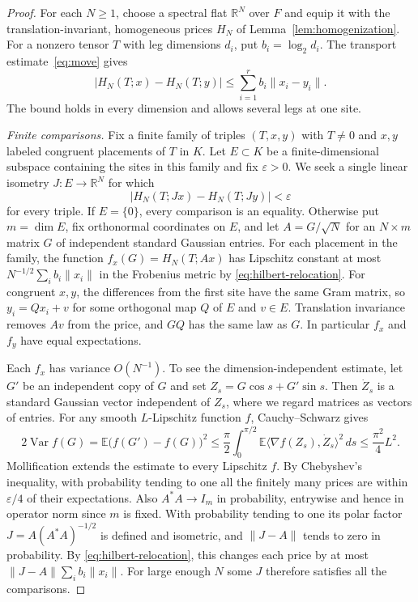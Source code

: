 \begin{proof}
For each $N\ge1$, choose a spectral flat $\mathbb R^N$ over $F$
and equip it with the translation-invariant, homogeneous prices
$H_N$ of Lemma~\ref{lem:homogenization}. For a nonzero tensor
$T$ with leg dimensions $d_i$, put $b_i=\log_2 d_i$.
The transport estimate~\eqref{eq:move} gives
\begin{equation}\label{eq:hilbert-relocation}
 |H_N(T;x)-H_N(T;y)|\le\sum_{i=1}^r b_i\|x_i-y_i\|.
\end{equation}
The bound holds in every dimension and allows several legs at one site.

\emph{Finite comparisons.}
Fix a finite family of triples $(T,x,y)$ with $T\ne0$ and $x,y$
labeled congruent placements of $T$ in $K$. Let $E\subset K$ be a
finite-dimensional subspace containing the sites in this family and
fix $\varepsilon>0$. We seek a single linear isometry
$J\colon E\to\mathbb R^N$ for which
\[
  |H_N(T;Jx)-H_N(T;Jy)|<\varepsilon
\]
for every triple. If $E=\{0\}$, every comparison is an equality.
Otherwise put $m=\dim E$, fix orthonormal coordinates on $E$, and
let $A=G/\sqrt N$ for an $N\times m$ matrix $G$ of independent
standard Gaussian entries. For each placement in the family, the
function $f_x(G)=H_N(T;Ax)$ has Lipschitz constant at most
$N^{-1/2}\sum_i b_i\|x_i\|$ in the Frobenius metric by
\eqref{eq:hilbert-relocation}. For congruent $x,y$, the differences
from the first site have the same Gram matrix, so $y_i=Qx_i+v$
for some orthogonal map $Q$ of $E$ and $v\in E$. Translation
invariance removes $Av$ from the price, and $GQ$ has the same law
as $G$. In particular $f_x$ and $f_y$ have equal expectations.

Each $f_x$ has variance $O(N^{-1})$. To see the dimension-independent
estimate, let $G'$ be an independent copy of $G$ and set
$Z_s=G\cos s+G'\sin s$. Then $\dot Z_s$ is a standard Gaussian vector
independent of $Z_s$, where we regard matrices as vectors of entries.
For any smooth $L$-Lipschitz function $f$, Cauchy--Schwarz gives
\[
  2\operatorname{Var} f(G)
  =\mathbb E\bigl(f(G')-f(G)\bigr)^2
  \le \frac{\pi}{2}\int_0^{\pi/2}
       \mathbb E\langle\nabla f(Z_s),\dot Z_s\rangle^2\,ds
  \le \frac{\pi^2}{4}L^2 .
\]
Mollification extends the estimate to every Lipschitz $f$.
By Chebyshev's inequality, with probability tending to one all the
finitely many prices are within $\varepsilon/4$ of their expectations.
Also $A^*A\to I_m$ in probability, entrywise and hence in operator
norm since $m$ is fixed. With probability tending to one its polar
factor $J=A(A^*A)^{-1/2}$ is defined and isometric, and $\|J-A\|$
tends to zero in probability. By \eqref{eq:hilbert-relocation}, this
changes each price by at most $\|J-A\|\sum_i b_i\|x_i\|$. For
large enough $N$ some $J$ therefore satisfies all the comparisons.


\end{proof}
